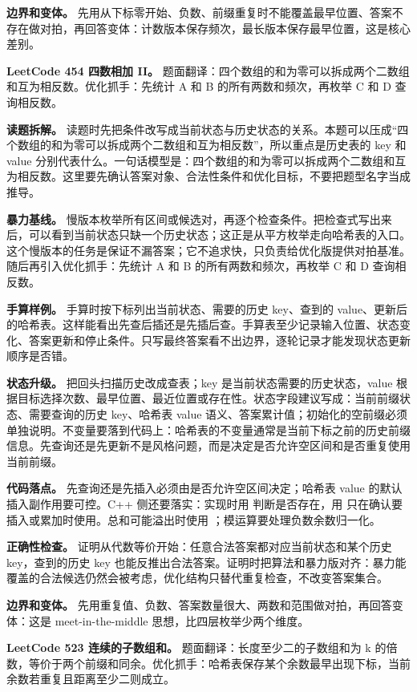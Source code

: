 \textbf{边界和变体。} 先用从下标零开始、负数、前缀重复时不能覆盖最早位置、答案不存在做对拍，再回答变体：计数版本保存频次，最长版本保存最早位置，这是核心差别。

\noindent\textbf{LeetCode 454 四数相加 II。} 题面翻译：四个数组的和为零可以拆成两个二数组和互为相反数。优化抓手：先统计 A 和 B 的所有两数和频次，再枚举 C 和 D 查询相反数。

\textbf{读题拆解。} 读题时先把条件改写成当前状态与历史状态的关系。本题可以压成“四个数组的和为零可以拆成两个二数组和互为相反数”，所以重点是历史表的 key 和 value 分别代表什么。一句话模型是：四个数组的和为零可以拆成两个二数组和互为相反数。这里要先确认答案对象、合法性条件和优化目标，不要把题型名字当成推导。

\textbf{暴力基线。} 慢版本枚举所有区间或候选对，再逐个检查条件。把检查式写出来后，可以看到当前状态只缺一个历史状态；这正是从平方枚举走向哈希表的入口。这个慢版本的任务是保证不漏答案；它不追求快，只负责给优化版提供对拍基准。随后再引入优化抓手：先统计 A 和 B 的所有两数和频次，再枚举 C 和 D 查询相反数。

\textbf{手算样例。} 手算时按下标列出当前状态、需要的历史 key、查到的 value、更新后的哈希表。这样能看出先查后插还是先插后查。手算表至少记录输入位置、状态变化、答案更新和停止条件。只写最终答案看不出边界，逐轮记录才能发现状态更新顺序是否错。

\textbf{状态升级。} 把回头扫描历史改成查表；key 是当前状态需要的历史状态，value 根据目标选择次数、最早位置、最近位置或存在性。状态字段建议写成：当前前缀状态、需要查询的历史 key、哈希表 value 语义、答案累计值；初始化的空前缀必须单独说明。不变量要落到代码上：哈希表的不变量通常是当前下标之前的历史前缀信息。先查询还是先更新不是风格问题，而是决定是否允许空区间和是否重复使用当前前缀。

\textbf{代码落点。} 先查询还是先插入必须由是否允许空区间决定；哈希表 value 的默认插入副作用要可控。C++ 侧还要落实：实现时用  判断是否存在，用  只在确认要插入或累加时使用。总和可能溢出时使用 ；模运算要处理负数余数归一化。

\textbf{正确性检查。} 证明从代数等价开始：任意合法答案都对应当前状态和某个历史 key，查到的历史 key 也能反推出合法答案。证明时把算法和暴力版对齐：暴力能覆盖的合法候选仍然会被考虑，优化结构只替代重复检查，不改变答案集合。

\textbf{边界和变体。} 先用重复值、负数、答案数量很大、两数和范围做对拍，再回答变体：这是 meet-in-the-middle 思想，比四层枚举少两个维度。

\noindent\textbf{LeetCode 523 连续的子数组和。} 题面翻译：长度至少二的子数组和为 k 的倍数，等价于两个前缀和同余。优化抓手：哈希表保存某个余数最早出现下标，当前余数若重复且距离至少二则成立。

